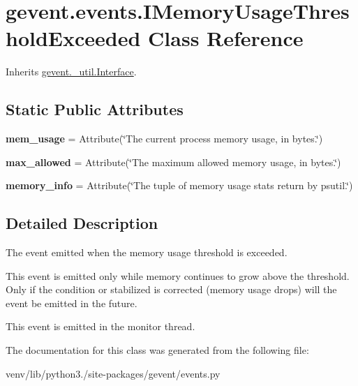 \hypertarget{classgevent_1_1events_1_1_i_memory_usage_threshold_exceeded}{}\section{gevent.\+events.\+I\+Memory\+Usage\+Threshold\+Exceeded Class Reference}
\label{classgevent_1_1events_1_1_i_memory_usage_threshold_exceeded}


Inherits \hyperlink{classgevent_1_1__util_1_1_interface}{gevent.\+\_\+util.\+Interface}.

\subsection*{Static Public Attributes}
\begin{DoxyCompactItemize}
\item 
\mbox{\label{classgevent_1_1events_1_1_i_memory_usage_threshold_exceeded_a5e440a1e5b9e38b8a751df34e49b19e8}} 
{\bfseries mem\+\_\+usage} = Attribute(\char`\"{}The current process memory usage, in bytes.\char`\"{})
\item 
\mbox{\label{classgevent_1_1events_1_1_i_memory_usage_threshold_exceeded_aad147856af1e46ccf00b7191e3ad2650}} 
{\bfseries max\+\_\+allowed} = Attribute(\char`\"{}The maximum allowed memory usage, in bytes.\char`\"{})
\item 
\mbox{\label{classgevent_1_1events_1_1_i_memory_usage_threshold_exceeded_abb66fccf777fd939422ad72233849c61}} 
{\bfseries memory\+\_\+info} = Attribute(\char`\"{}The tuple of memory usage stats return by psutil.\char`\"{})
\end{DoxyCompactItemize}


\subsection{Detailed Description}
\begin{DoxyVerb}The event emitted when the memory usage threshold is exceeded.

This event is emitted only while memory continues to grow
above the threshold. Only if the condition or stabilized is corrected (memory
usage drops) will the event be emitted in the future.

This event is emitted in the monitor thread.
\end{DoxyVerb}
 

The documentation for this class was generated from the following file\+:\begin{DoxyCompactItemize}
\item 
venv/lib/python3./site-\/packages/gevent/events.\+py\end{DoxyCompactItemize}
